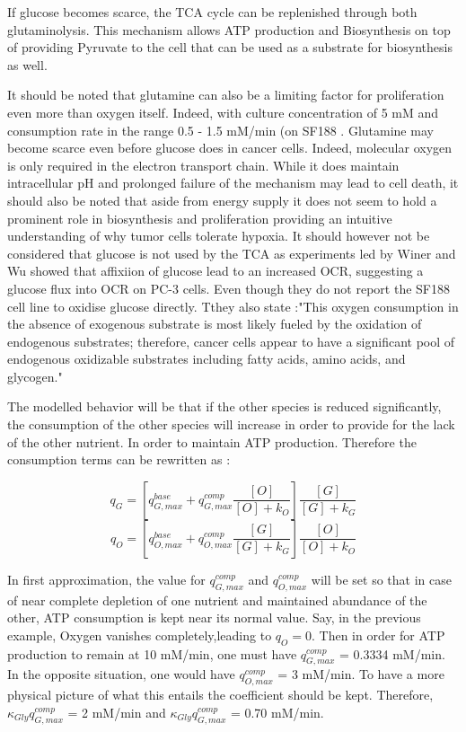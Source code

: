\documentclass[11pt,a4paper]{article}
\begin{document}
If glucose becomes scarce, the TCA cycle can be replenished through both glutaminolysis. This mechanism allows ATP production and Biosynthesis on top of providing Pyruvate to the cell that can be used as a substrate for biosynthesis as well. 

It should be noted that glutamine can also be a limiting factor for proliferation even more than oxygen itself. Indeed, with culture concentration of 5 mM and consumption rate in the range 0.5 - 1.5 mM/min (on SF188 \cite{Wise2008}. Glutamine may become scarce even before glucose does in cancer cells. Indeed, molecular oxygen is only required in the electron transport chain. While it does maintain intracellular pH and prolonged failure of the mechanism may lead to cell death, it should also be noted that aside from energy supply it does not seem to hold  a prominent role in biosynthesis and proliferation providing an intuitive understanding of why tumor cells tolerate hypoxia. It should however not be considered that glucose is not used by the TCA as experiments led by Winer and Wu showed that affixiion of glucose lead to an increased OCR, suggesting a glucose flux into OCR on PC-3 cells. Even though they do not report the SF188 cell line to oxidise glucose directly. Tthey also state :"This oxygen consumption in the absence of exogenous substrate is most likely fueled by the oxidation of endogenous substrates; therefore, cancer cells appear to have a significant pool of endogenous oxidizable substrates including fatty acids, amino acids, and glycogen."\cite{Winer2014}

The modelled behavior will be that if the other species is reduced significantly, the consumption of the other species will increase in order to provide for the lack of the other nutrient. In order to maintain ATP production. Therefore the consumption terms can be rewritten as :

\[ q_G =  [ q_{G,max}^{base} + q_{G,max}^{comp} \frac{[O]}{[O]+ k_O}] \frac{[G]}{[G] + k_G} \]
\[ q_O =  [ q_{O,max}^{base} + q_{O,max}^{comp} \frac{[G]}{[G]+ k_G}] \frac{[O]}{[O] + k_O} \]

In first approximation,  the value for $q_{G,max}^{comp}$ and $q_{O,max}^{comp}$ will be set so that in case of near complete depletion of one nutrient and maintained abundance of the other, ATP consumption is kept near its normal value. Say, in the previous example, Oxygen vanishes completely,leading to $q_O = 0$.  Then in order for ATP production to remain at 10 mM/min, one must have $q_{G,max}^{comp}$ = 0.3334 mM/min. In the opposite situation, one would have  $q_{O,max}^{comp}$ = 3 mM/min. To have a more physical picture of what this entails the coefficient should be kept.  Therefore,  $\kappa_{Gly}q_{G,max}^{comp}$ = 2 mM/min and  $\kappa_{Gly}q_{G,max}^{comp}$ = 0.70 mM/min.
\end{document}
